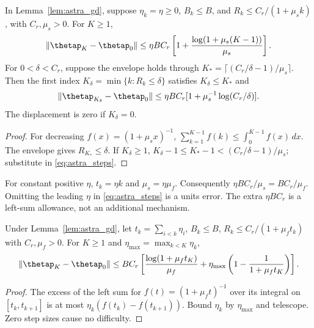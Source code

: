 \begin{corollary}
\label{cor:astra_steps}
In Lemma~\ref{lem:astra_gd}, suppose $\eta_k=\eta\ge0$, $B_k\le B$,
and $R_k\le C_r/(1+\mu_s k)$, with $C_r,\mu_s>0$.
For $K\ge1$,
\begin{equation}\label{eq:astra_steps}
 \|\thetap_K-\thetap_0\|
 \le\eta BC_r\left[1+\frac{\log(1+\mu_s(K-1))}{\mu_s}\right].
\end{equation}
For $0<\delta<C_r$, suppose the envelope holds through
$K_* =\lceil(C_r/\delta-1)/\mu_s\rceil$. Then the first index
$K_\delta=\min\{k:R_k\le\delta\}$ satisfies $K_\delta\le K_*$ and
\begin{equation}\label{eq:astra_hit}
 \|\thetap_{K_\delta}-\thetap_0\|
 \le\eta BC_r[1+\mu_s^{-1}\log(C_r/\delta)].
\end{equation}
The displacement is zero if $K_\delta=0$.
\end{corollary}
\begin{proof}
For decreasing $f(x)=(1+\mu_sx)^{-1}$,
$\sum_{k=1}^{K-1}f(k)\le\int_0^{K-1}f(x)\,dx$.
The envelope gives $R_{K_*}\le\delta$. If $K_\delta\ge1$,
$K_\delta-1\le K_*-1<(C_r/\delta-1)/\mu_s$; substitute in
\eqref{eq:astra_steps}.
\end{proof}
\begin{remark}
For constant positive $\eta$, $t_k=\eta k$ and $\mu_s=\eta\mu_f$.
Consequently $\eta BC_r/\mu_s=BC_r/\mu_f$. Omitting the leading
$\eta$ in \eqref{eq:astra_steps} is a units error. The extra
$\eta BC_r$ is a left-sum allowance, not an additional mechanism.
\end{remark}

\begin{lemma}
\label{lem:astra_variable}
Under Lemma~\ref{lem:astra_gd}, let $t_k=\sum_{i<k}\eta_i$,
$B_k\le B$, $R_k\le C_r/(1+\mu_ft_k)$ with $C_r,\mu_f>0$.
For $K\ge1$ and $\eta_{\max}=\max_{k<K}\eta_k$,
\begin{equation}\label{eq:astra_variable}
 \|\thetap_K-\thetap_0\|\le BC_r\left[
 \frac{\log(1+\mu_ft_K)}{\mu_f}
 +\eta_{\max}\left(1-\frac1{1+\mu_ft_K}\right)\right].
\end{equation}
\end{lemma}
\begin{proof}
The excess of the left sum for $f(t)=(1+\mu_ft)^{-1}$ over its
integral on $[t_k,t_{k+1}]$ is at most
$\eta_k(f(t_k)-f(t_{k+1}))$. Bound $\eta_k$ by $\eta_{\max}$ and
telescope. Zero step sizes cause no difficulty.
\end{proof}

